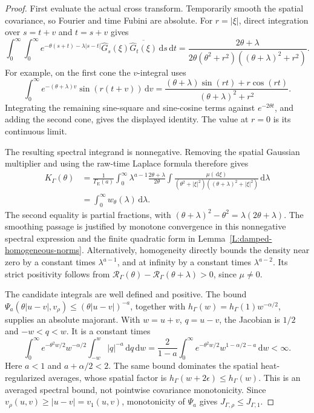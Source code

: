 \documentclass[12pt]{article}
\numberwithin{equation}{section}
\theoremstyle{definition}
\newcommand{\ud}{\,\mathrm{d}}
\begin{document}
\begin{proof}
  First evaluate the actual cross transform. Temporarily smooth the spatial
  covariance, so Fourier and time Fubini are absolute. For \(r=|\xi|\),
  direct integration over \(s=t+v\) and \(t=s+v\) gives
  \[
    \int_0^\infty\int_0^\infty
    e^{-\theta(s+t)-\lambda|s-t|}
    \widehat G_s(\xi)\overline{\widehat G_t(\xi)}\ud s\ud t
    =\frac{2\theta+\lambda}
    {2\theta(\theta^2+r^2)((\theta+\lambda)^2+r^2)} .
  \]
  For example, on the first cone the \(v\)-integral uses
  \[
    \int_0^\infty e^{-(\theta+\lambda)v}
    \sin(r(t+v))\ud v
    =\frac{(\theta+\lambda)\sin(rt)+r\cos(rt)}
    {(\theta+\lambda)^2+r^2}.
  \]
  Integrating the remaining sine-square and sine-cosine terms against
  \(e^{-2\theta t}\), and adding the second cone, gives the displayed
  identity. The value at \(r=0\) is its continuous limit.

  The resulting spectral integrand is nonnegative. Removing the spatial
  Gaussian multiplier and using the raw-time Laplace formula therefore gives
  \[
    \begin{split}
      K_\Gamma(\theta)
      &=\frac1{\Gamma_{\mathrm E}(a)}
      \int_0^\infty\lambda^{a-1}
      \frac{2\theta+\lambda}{2\theta}
      \int\frac{\mu(\ud\xi)}
      {(\theta^2+|\xi|^2)((\theta+\lambda)^2+|\xi|^2)}
      \ud\lambda\\
      &=\int_0^\infty w_\theta(\lambda)\ud\lambda.
    \end{split}
  \]
  The second equality is partial fractions, with
  \((\theta+\lambda)^2-\theta^2=\lambda(2\theta+\lambda)\).
  The smoothing passage is justified by monotone convergence in this
  nonnegative spectral expression and the finite quadratic form in
  Lemma~\ref{L:damped-homogeneous-norms}. Alternatively, homogeneity
  directly bounds the density near zero by a constant times
  \(\lambda^{a-1}\), and at infinity by a constant times
  \(\lambda^{a-2}\). Its strict positivity follows from
  \(\mathcal R_\Gamma(\theta)
  -\mathcal R_\Gamma(\theta+\lambda)>0\), since \(\mu\ne0\).

  The candidate integrals are well defined and positive.
  The bound \(\Psi_a(\theta|u-v|,v_\rho)\le
  (\theta|u-v|)^{-a}\), together with
  \(h_\Gamma(w)=h_\Gamma(1)w^{-\alpha/2}\), supplies an absolute
  majorant. With \(w=u+v\), \(q=u-v\), the Jacobian is \(1/2\) and
  \(-w<q<w\). It is a constant times
  \[
    \int_0^\infty e^{-\theta^2w/2}w^{-\alpha/2}
    \int_{-w}^w|q|^{-a}\ud q\ud w
    =\frac2{1-a}\int_0^\infty
    e^{-\theta^2w/2}w^{1-\alpha/2-a}\ud w<\infty .
  \]
  Here \(a<1\) and \(a+\alpha/2<2\).
  The same bound dominates the spatial heat-regularized averages, whose
  spatial factor is \(h_\Gamma(w+2\epsilon)\le h_\Gamma(w)\).
  This is an averaged spectral bound, not pointwise covariance monotonicity.
  Since \(v_\rho(u,v)\ge|u-v|=v_1(u,v)\), monotonicity of
  \(\Psi_a\) gives \(J_{\Gamma,\rho}\le J_{\Gamma,1}\).


\end{proof}
\end{document}
